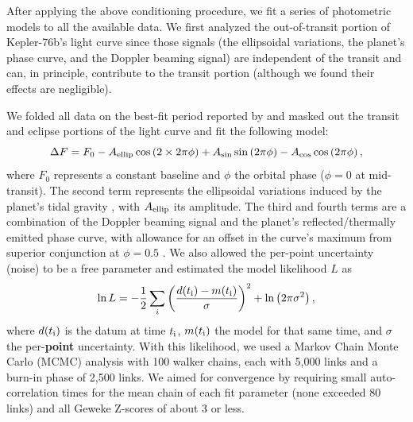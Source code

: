\documentclass[manuscript]{aastex62}
\begin{document}
After applying the above conditioning procedure, we fit a series of photometric models to all the available data. We first analyzed the out-of-transit portion of Kepler-76b's light curve since those signals (the ellipsoidal variations, the planet's phase curve, and the Doppler beaming signal) are independent of the transit and can, in principle, contribute to the transit portion (although we found their effects are negligible). 

We folded all data on the best-fit period reported by \citet{2013ApJ...771...26F} and masked out the transit and eclipse portions of the light curve and fit the following model:
\begin{equation}
    \Delta F = F_0 - A_{\rm ellip} \cos \left(2\times2\pi\phi \right) + A_{\rm sin} \sin \left(2 \pi\phi \right) - A_{\rm cos} \cos \left(2\pi \phi \right),
\label{eqn:BEER_curve}
\end{equation}
where $F_0$ represents a constant baseline and $\phi$ the orbital phase ($\phi = 0$ at mid-transit). The second term represents the ellipsoidal variations induced by the planet's tidal gravity \citep{2010ApJ...713L.145W}, with $A_{\rm ellip}$ its amplitude. The third and fourth terms are a combination of the Doppler beaming signal \citep{2003ApJ...588L.117L} and the planet's reflected/thermally emitted phase curve, with allowance for an offset in the curve's maximum from superior conjunction at $\phi = 0.5$ \citep{2013ApJ...771...26F}. We also allowed the per-point uncertainty (noise) to be a free parameter and estimated the model likelihood $L$ as
\begin{equation}
    \ln L = -\frac{1}{2} \sum_i \bigg( \frac{ d(t_{\rm i}) - m(t_{\rm i}) }{\sigma} \bigg)^2 + \ln \left( 2 \pi \sigma^2 \right),
    \label{eqn:likelihood}
\end{equation}
where $d(t_{\rm i})$ is the datum at time $t_{\rm i}$, $m(t_{\rm i})$ the model for that same time, and $\sigma$ the per-\textbf{point} uncertainty. With this likelihood, we used a Markov Chain Monte Carlo (MCMC) analysis \citep{2013PASP..125..306F} with 100 walker chains, each with 5,000 links and a burn-in phase of 2,500 links. We aimed for convergence by requiring small auto-correlation times \citep[e.g.,][]{geyer1992} for the mean chain of each fit parameter (none exceeded 80 links) and all Geweke Z-scores \citep{Geweke92evaluatingthe} of about 3 or less. 
\end{document}
